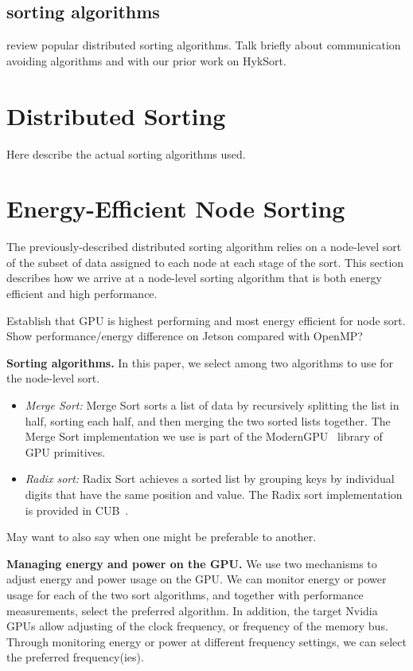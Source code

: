 \documentclass{sig-alternate}
\begin{document}
\subsection{sorting algorithms}
review popular distributed sorting algorithms. Talk briefly about communication avoiding algorithms and with our prior work on HykSort.

\section{Distributed Sorting}

Here describe the actual sorting algorithms used.

\section{Energy-Efficient Node Sorting}
The previously-described distributed sorting algorithm relies
on a node-level sort of the subset of data assigned to each node at 
each stage of the sort.  This section describes how we arrive 
at a node-level sorting algorithm that is both energy efficient and
high performance.  

{\color{red}Establish that GPU is highest performing and most energy efficient for node sort.
Show performance/energy difference on Jetson compared with OpenMP?}  

\noindent
{\bf Sorting algorithms.}
In this paper, we select among two algorithms to use for
the node-level sort.  
\begin{itemize}
\item \emph{Merge Sort:}
Merge Sort sorts a list of data by 
recursively splitting the list in half, sorting each half,
and then merging the two sorted lists together.
The Merge Sort implementation we use is
part of the ModernGPU~\cite{modernGPU} library of GPU
primitives.  
\item \emph{Radix sort:}
Radix Sort achieves a sorted list by grouping keys by individual digits  
that have the same position and value.
The Radix sort implementation is provided in CUB~\cite{cub}. 
\end{itemize}
{\color{red} May want to also say when one might be preferable to another.}

\noindent
{\bf Managing energy and power on the GPU.} 
We use two mechanisms to adjust energy and power usage on the GPU.  
We can monitor energy or power usage for each of the two 
sort algorithms, and together with performance measurements,
select the preferred algorithm.  In addition, the target Nvidia GPUs
allow adjusting of the clock frequency, or frequency of the memory
bus.  Through monitoring energy or power at different frequency
settings, we can select the preferred frequency(ies).  
\end{document}
